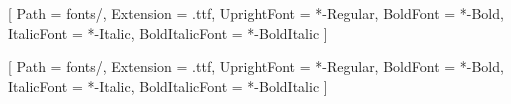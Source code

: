 \usepackage{booktabs}


\usepackage{fancyhdr}
\pagestyle{fancy}

\fancyhf{}

\fancyfoot[C]{\thepage} 

\renewcommand{\headrulewidth}{0pt}

\usepackage{setspace}
\onehalfspacing

\usepackage{fontspec}

\setmainfont{Asap}[
  Path = fonts/,
  Extension = .ttf,
  UprightFont = *-Regular,
  BoldFont = *-Bold,
  ItalicFont = *-Italic,
  BoldItalicFont = *-BoldItalic
]

\newfontfamily{}[
  Path = fonts/,
  Extension = .ttf,
  UprightFont = *-Regular,
  BoldFont = *-Bold,
  ItalicFont = *-Italic,
  BoldItalicFont = *-BoldItalic
]

\usepackage{sectsty}
\chapterfont{\headerfont\bfseries}
\sectionfont{\headerfont\bfseries}
\subsectionfont{\headerfont}
\subsubsectionfont{\headerfont}

\usepackage[all]{nowidow}

\usepackage{parskip}
\setlength{\parskip}{1em}
\setlength{\parindent}{0pt}

\usepackage{titlesec}
\titlespacing*{\chapter}{0pt}{-15pt}{15pt}
\titlespacing*{\section}{0pt}{12pt}{6pt}
\titlespacing*{\subsection}{0pt}{10pt}{6pt}

